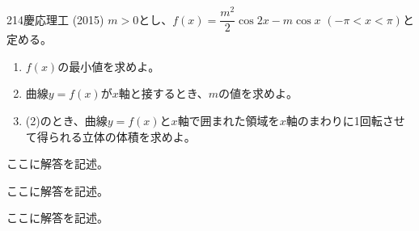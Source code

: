 \begin{prob}{214}{}{慶応理工 (2015)}
 $m>0$とし、$f(x)=\dfrac{m^2}{2}\cos 2x-m\cos x$ $(-\pi<x<\pi)$と定める。
 \begin{enumerate}
  \item $f(x)$の最小値を求めよ。
  \item 曲線$y=f(x)$が$x$軸と接するとき、$m$の値を求めよ。
  \item (2)のとき、曲線$y=f(x)$と$x$軸で囲まれた領域を$x$軸のまわりに1回転させて得られる立体の体積を求めよ。
 \end{enumerate}
\end{prob}
ここに解答を記述。

ここに解答を記述。

ここに解答を記述。